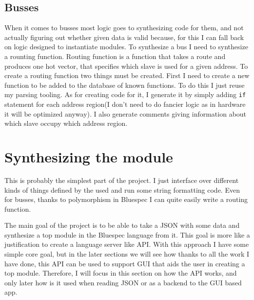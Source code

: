 \documentclass[12pt]{report}
\begin{document}
\subsection{Busses}
When it comes to busses most logic goes to synthesizing code for them, and not actually figuring out whether given data is valid because, for this I can fall back on logic designed to instantiate modules. To synthesize a bus I need to synthesize a rounting function.
Routing function is a function that takes a route and produces one hot vector, that specifies which slave is used for a given address. 
To create a routing function two things must be created. First I need to create a new function to be added to the database of known functions. To do this I just reuse my parsing tooling. As for creating code for it, I generate it by simply adding \verb!if! statement for each address region(I don't need to do fancier logic as in hardware it will be optimized anyway). I also generate comments giving information about which slave occupy which address region.

\section{Synthesizing the module}
This is probably the simplest part of the project. I just interface over different kinds of things defined by the used and run some string formatting code. Even for busses, thanks to polymorphism in Bluespec I can quite easily write a routing function.


The main goal of the project is to be able to take a JSON with some data and synthesize a top module in the Bluespec language from it. This goal is more like a justification to create a language server like API. With this approach I have some simple core goal, but in the later sections we will see how thanks to all the work I have done, this API can be used to support GUI that aids the user in creating a top module. Therefore, I will focus in this section on how the API works, and only later how is it used when reading JSON or as a backend to the GUI based app.
\end{document}

